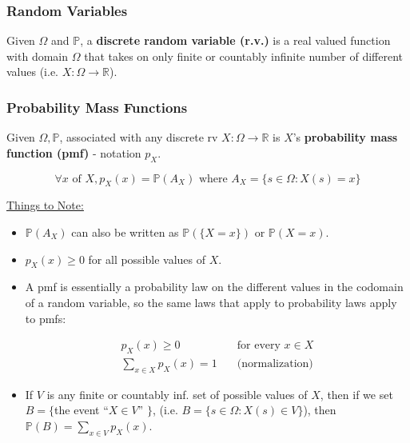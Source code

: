 \documentclass{article}
\begin{document}
\subsubsection{Random Variables}

Given $\Omega$ and $\mathbb{P}$, a \textbf{discrete random variable
  (r.v.)} is a real valued function with domain $\Omega$ that takes on
only finite or countably infinite number of different values (i.e. $X
: \Omega \rightarrow \mathbb{R}$).

\subsubsection{Probability Mass Functions}

Given $\Omega, \mathbb{P}$, associated with any discrete rv $X :
\Omega \rightarrow \mathbb{R}$ is $X$'s \textbf{probability mass
  function (pmf)} - notation $p_X$.

\begin{equation}
  \tag{pmf Def}
  \boxed{
    \forall x \text{ of } X, p_X(x) = \mathbb{P}(A_X)
    \text{ where } A_X = \{s \in \Omega : X(s) = x\}
  }
\end{equation}

\bigskip
\underline{Things to Note:}

\begin{itemize}
\item $\mathbb{P}(A_X)$ can also be written as $\mathbb{P}(\{X = x\})$
  or $\mathbb{P}(X = x)$.

\item $p_X(x) \geq 0$ for all possible values of $X$.

\item A pmf is essentially a probability law on the different values
  in the codomain of a random variable, so the same laws that apply
  to probability laws apply to pmfs:

  \[
    \begin{aligned}
      p_X(x) \ge 0 & \quad \text{for every } x \in X \\
      \sum\limits_{x \in X} p_X(x) = 1 & \quad \text{(normalization)}
    \end{aligned}
  \]

\item If $V$ is any finite or countably inf. set of possible values of
  $X$, then if we set $B = \{ $the event ``$X \in V$'' $\}$,
  (i.e. $B = \{ s \in \Omega : X(s) \in V \} $), then
  $\mathbb{P}(B) = \sum\limits_{x \in V} p_X(x)$.
\end{itemize}
\end{document}
